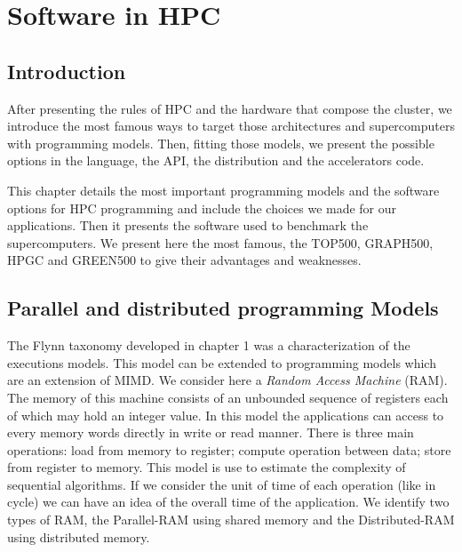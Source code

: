 
\chapter{Software in HPC}

\section{Introduction}
After presenting the rules of HPC and the hardware that compose the cluster, we introduce the most famous ways to target those architectures and supercomputers with programming models.
Then, fitting those models, we present the possible options in the language, the API, the distribution and the accelerators code. 

This chapter details the most important programming models and the software options for HPC programming and include the choices we made for our applications.
Then it presents the software used to benchmark the supercomputers. 
We present here the most famous, the TOP500, GRAPH500, HPGC and GREEN500 to give their advantages and weaknesses. 

\section{Parallel and distributed programming Models}
The Flynn taxonomy developed in chapter 1 was a characterization of the executions models. 
This model can be extended to programming models which are an extension of MIMD. 
We consider here a \textit{Random Access Machine} (RAM). 
The memory of this machine consists of an unbounded sequence of registers each of which may hold an integer value. 
In this model the applications can access to every memory words directly in write or read manner.
There is three main operations: load from memory to register; compute operation between data; store from register to memory. 
This model is use to estimate the complexity of sequential algorithms. 
If we consider the unit of time of each operation (like in cycle) we can have an idea of the overall time of the application.
We identify two types of RAM, the Parallel-RAM using shared memory and the Distributed-RAM using distributed memory. 

